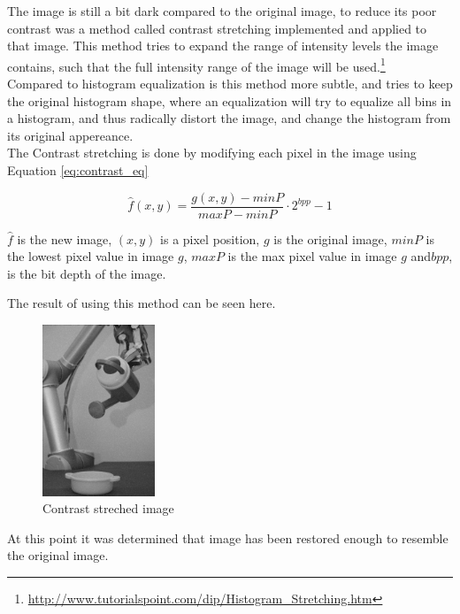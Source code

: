 The image is still a bit dark compared to the original image, to reduce its poor contrast was a method called contrast stretching implemented and applied to that image.  This method tries to expand the range of intensity levels the image contains, such that the full intensity range of the image will be used.\footnote{\url{http://www.tutorialspoint.com/dip/Histogram\_Stretching.htm}} \\


Compared to histogram equalization is this method more subtle, and tries to keep the original histogram shape, where an equalization  will try to equalize all bins in a histogram, and thus radically distort the image, and change the histogram from its original appereance.\\



The Contrast stretching is  done by modifying each pixel in the image using Equation \ref{eq:contrast_eq}

\begin{equation}
\hat{f}(x,y) = \frac{g(x,y) - minP}{maxP - minP} \cdot 2^{bpp }-1
\label{eq:contrast_eq}
\end{equation}
  
$\hat{f}$ is the new image,  $(x,y)$ is  a pixel position, $g$ is the original image, $minP$ is the lowest pixel value in image $g$, $maxP$ is the max pixel value in image $g$ and$ bpp$, is the bit depth of the image. 

The result of using this method can be seen here. 

\begin{figure}[H]
\centering
 \includegraphics[width=0.30\textwidth]{img1/img_1_gaus_5_1_constrast_strech.png}
        \caption{Contrast streched image}
         \label{fig:img1_contra11_1}
\end{figure}

At this point it was determined that image has been restored enough to resemble the original image. 

